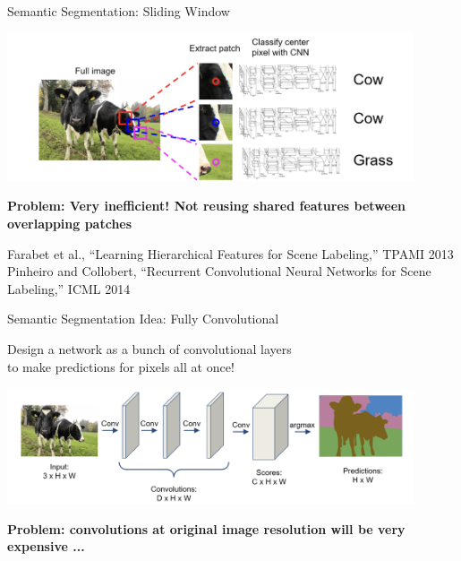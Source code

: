 \documentclass[serif, aspectratio=169]{beamer}
\begin{document}
\begin{frame}{Semantic Segmentation: Sliding Window}
    \begin{center}
        \includegraphics[width=0.9\textwidth]{pic/SS sliding window.png}
    \end{center}
    
    \vspace{0.3cm}
    
    \textcolor{deepred}{\textbf{Problem: Very inefficient! Not reusing shared features between overlapping patches}}
    
    \vspace{0.3cm}
    
    \scriptsize{
    Farabet et al., “Learning Hierarchical Features for Scene Labeling,” TPAMI 2013 \\
    Pinheiro and Collobert, “Recurrent Convolutional Neural Networks for Scene Labeling,” ICML 2014
    }
    \vspace{0.2cm}

\end{frame}

\begin{frame}{Semantic Segmentation Idea: Fully Convolutional}
  
    
    \begin{center}
        Design a network as a bunch of convolutional layers \\
        to make predictions for pixels all at once!
    \end{center}

      \begin{center}
        \includegraphics[width=0.9\textwidth]{pic/SS fully conv1.png}
    \end{center}
    
    \vspace{0.1cm}
    
    
    \textcolor{deepred}{\textbf{Problem: convolutions at original image resolution will be very expensive ...}}
\end{frame}
\end{document}
